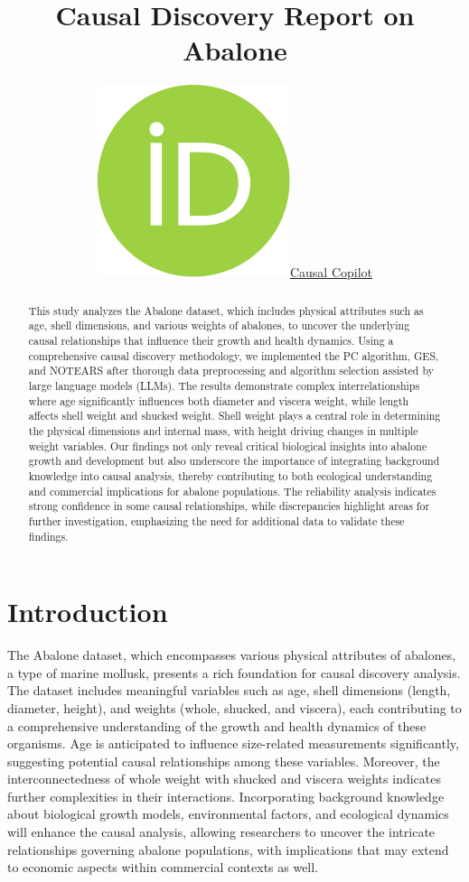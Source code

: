 \documentclass{article}
\title{Causal Discovery Report on Abalone}
\author{ \href{https://orcid.org/0000-0000-0000-0000}{\includegraphics[scale=0.06]{postprocess/context/orcid.pdf}\hspace{1mm}Causal Copilot}}
\begin{document}
\maketitle

\begin{abstract}
This study analyzes the Abalone dataset, which includes physical attributes such as age, shell dimensions, and various weights of abalones, to uncover the underlying causal relationships that influence their growth and health dynamics. Using a comprehensive causal discovery methodology, we implemented the PC algorithm, GES, and NOTEARS after thorough data preprocessing and algorithm selection assisted by large language models (LLMs). The results demonstrate complex interrelationships where age significantly influences both diameter and viscera weight, while length affects shell weight and shucked weight. Shell weight plays a central role in determining the physical dimensions and internal mass, with height driving changes in multiple weight variables. Our findings not only reveal critical biological insights into abalone growth and development but also underscore the importance of integrating background knowledge into causal analysis, thereby contributing to both ecological understanding and commercial implications for abalone populations. The reliability analysis indicates strong confidence in some causal relationships, while discrepancies highlight areas for further investigation, emphasizing the need for additional data to validate these findings.
\end{abstract}


\raggedbottom
\section{Introduction}
The Abalone dataset, which encompasses various physical attributes of abalones, a type of marine mollusk, presents a rich foundation for causal discovery analysis. The dataset includes meaningful variables such as age, shell dimensions (length, diameter, height), and weights (whole, shucked, and viscera), each contributing to a comprehensive understanding of the growth and health dynamics of these organisms. Age is anticipated to influence size-related measurements significantly, suggesting potential causal relationships among these variables. Moreover, the interconnectedness of whole weight with shucked and viscera weights indicates further complexities in their interactions. Incorporating background knowledge about biological growth models, environmental factors, and ecological dynamics will enhance the causal analysis, allowing researchers to uncover the intricate relationships governing abalone populations, with implications that may extend to economic aspects within commercial contexts as well.
\end{document}
